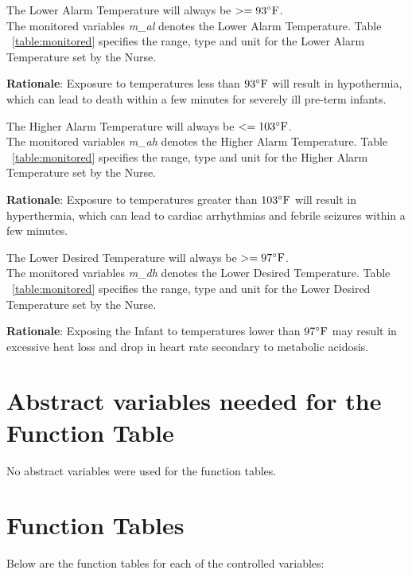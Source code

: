 \documentclass[fontsize=12pt,paper=letter,twoside]{scrartcl}
\begin{document}
\edescription
{The Lower Alarm Temperature will always be $ >= 93^{\circ}\mathrm{F}$.\\}
{The monitored variables \emph{m\_al} denotes the Lower Alarm Temperature. Table ~\ref{table:monitored} specifies the range, type and unit for the Lower Alarm Temperature set by the Nurse.}
\label{E3}

\smallskip
\noindent \textbf{Rationale}: Exposure to temperatures less than $93^{\circ}\mathrm{F}$ will result in hypothermia, which can lead to death within a few minutes for severely ill pre-term infants.

\edescription
{The Higher Alarm Temperature will always be $ <= 103^{\circ}\mathrm{F}$.\\}
{The monitored variables \emph{m\_ah} denotes the Higher Alarm Temperature. Table ~\ref{table:monitored} specifies the range, type and unit for the Higher Alarm Temperature set by the Nurse.}
\label{E4}

\smallskip
\noindent \textbf{Rationale}: Exposure to temperatures greater than $103^{\circ}\mathrm{F}$ will result in hyperthermia, which can lead to cardiac arrhythmias and febrile seizures within a few minutes.

\edescription
{The Lower Desired Temperature will always be $ >= 97^{\circ}\mathrm{F}$.\\}
{The monitored variables \emph{m\_dh} denotes the Lower Desired Temperature. Table ~\ref{table:monitored} specifies the range, type and unit for the Lower Desired Temperature set by the Nurse.}
\label{E5}

\smallskip
\noindent \textbf{Rationale}: Exposing the Infant to temperatures lower than $97^{\circ}\mathrm{F}$ may result in excessive heat loss and drop in heart rate secondary to metabolic acidosis.


\newpage
\section{Abstract variables needed for the Function Table}

No abstract variables were used for the function tables.

\newpage
\section{Function Tables}

Below are the function tables for each of the controlled variables:\\
\end{document}
